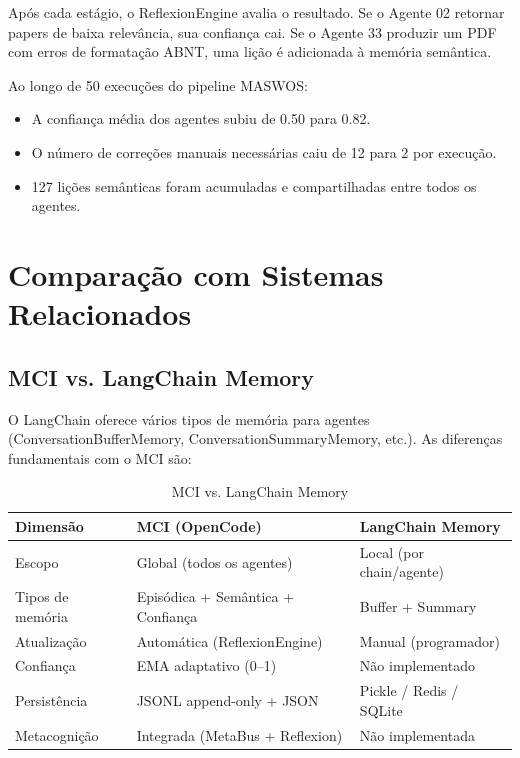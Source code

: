 Após cada estágio, o ReflexionEngine avalia o resultado. Se o Agente 02 retornar papers de baixa relevância, sua confiança cai. Se o Agente 33 produzir um PDF com erros de formatação ABNT, uma lição é adicionada à memória semântica.

Ao longo de 50 execuções do pipeline MASWOS:

\begin{itemize}
    \item A confiança média dos agentes subiu de 0.50 para 0.82.
    \item O número de correções manuais necessárias caiu de 12 para 2 por execução.
    \item 127 lições semânticas foram acumuladas e compartilhadas entre todos os agentes.
\end{itemize}

\section{Comparação com Sistemas Relacionados}
\label{sec:comparison}

\subsection{MCI vs. LangChain Memory}

O LangChain \cite{Lewis2020_RAG} oferece vários tipos de memória para agentes (ConversationBufferMemory, ConversationSummaryMemory, etc.). As diferenças fundamentais com o MCI são:

\begin{table}[htbp]
\centering
\caption{MCI vs. LangChain Memory}
\label{tab:mci-vs-langchain}
\begin{tabular}{@{}p{3.5cm}p{5cm}p{5cm}@{}}
\toprule
\textbf{Dimensão} & \textbf{MCI (OpenCode)} & \textbf{LangChain Memory} \\
\midrule
Escopo & Global (todos os agentes) & Local (por chain/agente) \\
Tipos de memória & Episódica + Semântica + Confiança & Buffer + Summary \\
Atualização & Automática (ReflexionEngine) & Manual (programador) \\
Confiança & EMA adaptativo (0--1) & Não implementado \\
Persistência & JSONL append-only + JSON & Pickle / Redis / SQLite \\
Metacognição & Integrada (MetaBus + Reflexion) & Não implementada \\
\bottomrule
\end{tabular}
\end{table}

